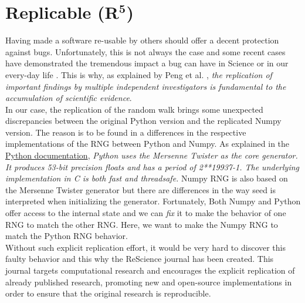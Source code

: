 \documentclass[a4paper,11pt]{article}
\begin{document}
\section*{Replicable (R$^{\mathbf 5}$)}

Having made a software re-usable by others should offer a decent protection against bugs.
Unfortunately, this is not always the case and some recent cases have demonstrated the tremendous impact a bug can have in Science \citep{Eklund:2016} or in our every-day life \citep{Durumeric:2014}.
This is why, as explained by Peng et al. \cite{Peng:2006}, {\em the replication of important findings by multiple independent investigators is fundamental to the accumulation of scientific evidence}.\\

In our case, the replication of the random walk brings some unexpected discrepancies between the original Python version and the replicated Numpy version.
The reason is to be found in a differences in the respective implementations of the RNG between Python and Numpy.
As explained in the \href{https://docs.python.org/3.6/library/random.html}{Python documentation}, {\em Python uses the Mersenne Twister as the core generator. It produces 53-bit precision floats
and has a period of 2**19937-1.
The underlying implementation in C is both fast and threadsafe.}
Numpy RNG is also based on the Mersenne Twister generator but there are differences in the way seed is interpreted when initializing the generator.
Fortunately, Both Numpy and Python offer access to the internal state and we can {\em fix} it to make the behavior of one RNG to match the other RNG.
Here, we want to make the Numpy RNG to match the Python RNG behavior.\\

Without such explicit replication effort, it would be very hard to discover this faulty behavior and this why the ReScience journal has been created.
This journal targets computational research and encourages the explicit replication of already published research, promoting new and open-source implementations in order to ensure that the original research is reproducible.
\end{document}
